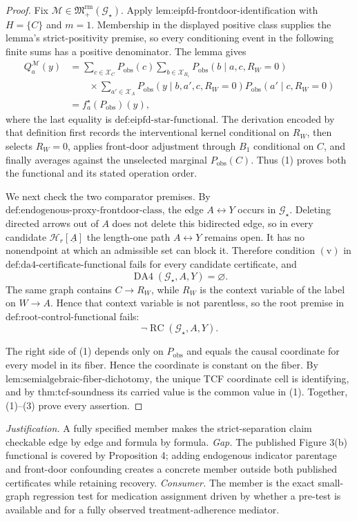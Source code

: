 \documentclass{article}
\begin{document}
\begin{proof}
Fix \(\mathcal M\in\mathfrak M_{+}^{\mathrm{rm}}(\mathcal G_\star)\).  Apply \(\text{lem:eipfd-frontdoor-identification}\) with \(H=\{C\}\) and \(m=1\).  Membership in the displayed positive class supplies the lemma's strict-positivity premise, so every conditioning event in the following finite sums has a positive denominator.  The lemma gives
\[
\begin{aligned}
Q_a^{\mathcal M}(y)
&=\sum_{c\in\mathcal X_C}P_{\mathrm{obs}}(c)
\sum_{b\in\mathcal X_{B_1}}P_{\mathrm{obs}}(b\mid a,c,R_W=0)\\
&\qquad\times\sum_{a'\in\mathcal X_A}
P_{\mathrm{obs}}(y\mid b,a',c,R_W=0)
P_{\mathrm{obs}}(a'\mid c,R_W=0)\\
&=f_a^\star(P_{\mathrm{obs}})(y),
\end{aligned}
\tag{1}
\]
where the last equality is \(\text{def:eipfd-star-functional}\).  The derivation encoded by that definition first records the interventional kernel conditional on \(R_W\), then selects \(R_W=0\), applies front-door adjustment through \(B_1\) conditional on \(C\), and finally averages against the unselected marginal \(P_{\mathrm{obs}}(C)\).  Thus (1) proves both the functional and its stated operation order.

We next check the two comparator premises.  By \(\text{def:endogenous-proxy-frontdoor-class}\), the edge \(A\leftrightarrow Y\) occurs in \(\mathcal G_\star\).  Deleting directed arrows out of \(A\) does not delete this bidirected edge, so in every candidate \(\mathcal H_r[\underline A]\) the length-one path \(A\leftrightarrow Y\) remains open.  It has no nonendpoint at which an admissible set can block it.  Therefore condition \(\mathrm{(v)}\) in \(\text{def:da4-certificate-functional}\) fails for every candidate certificate, and
\[
\operatorname{DA4}(\mathcal G_\star,A,Y)=\varnothing.
\tag{2}
\]
The same graph contains \(C\to R_W\), while \(R_W\) is the context variable of the label on \(W\to A\).  Hence that context variable is not parentless, so the root premise in \(\text{def:root-control-functional}\) fails:
\[
\neg\operatorname{RC}(\mathcal G_\star,A,Y).
\tag{3}
\]

The right side of (1) depends only on \(P_{\mathrm{obs}}\) and equals the causal coordinate for every model in its fiber.  Hence the coordinate is constant on the fiber.  By \(\text{lem:semialgebraic-fiber-dichotomy}\), the unique TCF coordinate cell is identifying, and by \(\text{thm:tcf-soundness}\) its carried value is the common value in (1).  Together, (1)--(3) prove every assertion.
\end{proof}
\par\smallskip\noindent \textit{Justification.} A fully specified member makes the strict-separation claim checkable edge by edge and formula by formula. \textit{Gap.} The published Figure 3(b) functional is covered by Proposition 4; adding endogenous indicator parentage and front-door confounding creates a concrete member outside both published certificates while retaining recovery. \textit{Consumer.} The member is the exact small-graph regression test for medication assignment driven by whether a pre-test is available and for a fully observed treatment-adherence mediator.
\end{document}
